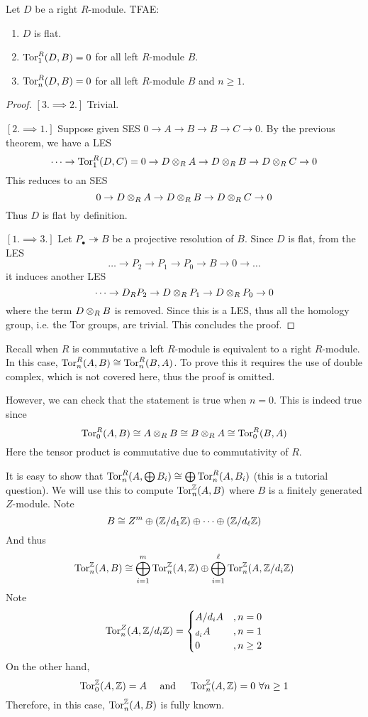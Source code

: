 \begin{pro} 
    Let $D$ be a right $R$-module. TFAE:
    \begin{enumerate}
        \item $D$ is flat.
        \item $\operatorname{Tor}_1^R(D,B)=0$ for all left $R$-module $B$.
        \item $\operatorname{Tor}_n^R(D,B)=0$ for all left $R$-module $B$ and $n\geq 1$.
    \end{enumerate}
\end{pro}
\begin{proof}
    \hfill

    $[3. \implies 2.]$ Trivial.

    $[2. \implies 1.]$ Suppose given SES $0\to A \to B \to B \to C \to 0$. By the previous theorem, we have a LES
    \[\dots \to \operatorname{Tor}_1^R(D,C)=0 \to D\otimes_R A \to D\otimes_R B\to D\otimes_R C\to 0\]
    This reduces to an SES
    \[0 \to D\otimes_R A \to D\otimes_R B\to D\otimes_R C\to 0\]
    Thus $D$ is flat by definition.

    $[1. \implies 3.]$ Let $P_\bullet \twoheadrightarrow B$ be a projective resolution of $B$. Since $D$ is flat, from the LES
    \[\dots \to P_2 \to P_1 \to P_0 \to B \to 0 \to \dots\]
    it induces another LES
    \[\dots \to D_R P_2 \to D \otimes_R P_1 \to D \otimes_R P_0 \to 0\]
    where the term $D\otimes_R B$ is removed. Since this is a LES, thus all the homology group, i.e. the Tor groups, are trivial. This concludes the proof.
\end{proof}

\begin{re}
    Recall when $R$ is commutative a left $R$-module is equivalent to a right $R$-module. In this case, $\operatorname{Tor}_n^R(A,B)\cong \operatorname{Tor}_n^R(B,A)$. To prove this it requires the use of double complex, which is not covered here, thus the proof is omitted.

    However, we can check that the statement is true when $n=0$. This is indeed true since 
    \[\operatorname{Tor}_0^R(A,B)\cong A\otimes_R B \cong B\otimes_R A \cong \operatorname{Tor}_0^R(B,A)\]
    Here the tensor product is commutative due to commutativity of $R$.
\end{re}

\medskip

\begin{ex}
    It is easy to show that $\operatorname{Tor}_n^R(A,\bigoplus B_i) \cong \bigoplus \operatorname{Tor}_n^R(A,B_i)$ (this is a tutorial question). We will use this to compute $\operatorname{Tor}_n^{\mathbb Z}(A,B)$ where $B$ is a finitely generated $Z$-module. Note
    \[B\cong Z^m \oplus ({\mathbb Z}/d_1{\mathbb Z}) \oplus \dots \oplus({\mathbb Z}/d_\ell {\mathbb Z})\]
    And thus
    \[\operatorname{Tor}_n^{\mathbb Z}(A,B)\cong \bigoplus_{i=1}^m \operatorname{Tor}^{\mathbb Z}_n(A,{\mathbb Z}) \oplus \bigoplus_{i=1}^\ell \operatorname{Tor}_n^{\mathbb Z}(A,{\mathbb Z}/d_i{\mathbb Z})\]
    Note 
    \[\operatorname{Tor}_n^Z(A,{\mathbb Z}/d_i{\mathbb Z})=
    \begin{cases}
        A/d_iA&, n=0\\
        _{d_i}A&, n=1\\
        0&, n\geq 2
    \end{cases}\]
    On the other hand,
    \[\operatorname{Tor}_0^{\mathbb Z}(A,{\mathbb Z})=A\quad \text{ and } \quad \operatorname{Tor}_n^{\mathbb Z}(A,{\mathbb Z})=0\ \forall n\geq 1\]
    Therefore, in this case, $\operatorname{Tor}_n^{\mathbb Z}(A,B)$ is fully known.
\end{ex}

